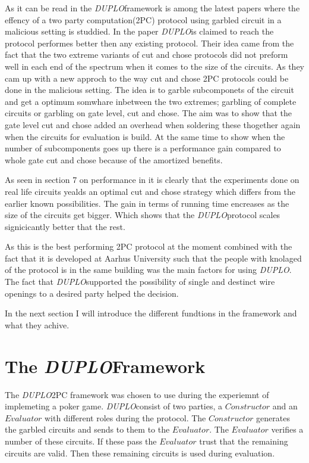 \documentclass[twoside,11pt,openright]{report}
\newcommand{\DUPLO}{\textit{DUPLO}}
\begin{document}
As it can be read in  the \DUPLO framework is among the latest papers where the effency of a two party computation(2PC) protocol using garbled circuit in a malicious setting is studdied. In the paper \DUPLO is claimed to reach the protocol performes better then any existing protocol. Their idea came from the fact that the two extreme variants of cut and chose protocols did not preform well in each end of the spectrum when it comes to the size of the circuits. As they cam up with a new approch to the way cut and chose 2PC protocols could be done in the malicious setting. The idea is to garble subcomponets of the circuit and get a optimum somwhare inbetween the two extremes; garbling of complete circuits or garbling on gate level, cut and chose. The aim was to show that the gate level cut and chose added an overhead when soldering these thogether again when the circuits for evaluation is build. At the same time to show when the number of subcomponents goes up there is a performance gain compared to whole gate cut and chose because of the amortized benefits. 

As seen in section 7 on performance in  it is clearly that the experiments done on real life circuits yealds an optimal cut and chose strategy which differs from the earlier known possibilities. The gain in terms of running time encreases as the size of the circuits get bigger. Which shows that the \DUPLO protocol scales signicicantly better that the rest.

\bigskip

As this is the best performing 2PC protocol at the moment combined with the fact that it is developed at Aarhus University such that the people with knolaged of the protocol is in the same building was the main factors for using \DUPLO. The fact that \DUPLO supported the possibility of single and destinct wire openings to a desired party helped the decision. 

\bigskip

In the next section I will introduce the different fundtions in the framework and what they achive.

\section{The \DUPLO Framework}
\label{sec:duplo_framework}
The \DUPLO 2PC framework was chosen to use during the experiemnt of implemeting a poker game. \DUPLO consist of two parties, a $Constructor$ and an $Evaluator$ with different roles during the protocol. The $Constructor$ generates the garbled circuits and sends to them to the $Evaluator$. The $Evaluator$ verifies a number of these circuits. If these pass the $Evaluator$ trust that the remaining circuits are valid. Then these remaining circuits is used during evaluation.
\end{document}
